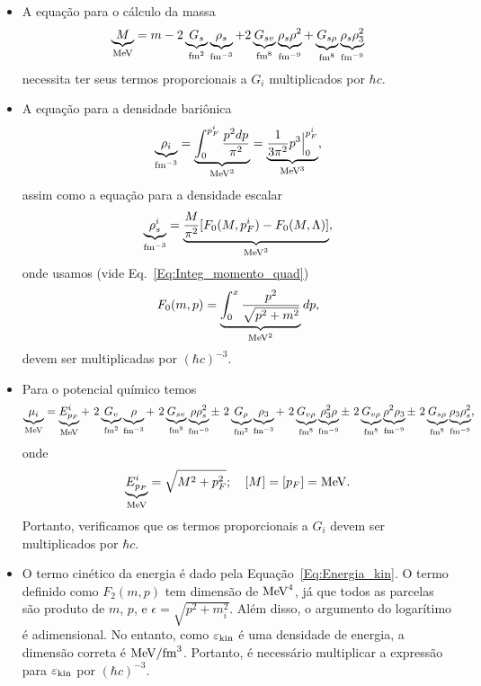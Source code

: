 \begin{fullwidth}
\begin{itemize}
\item A equação para o cálculo da massa
\begin{equation}
	\underbrace{M}_{\rm{MeV}} = m - 2 \underbrace{G_s}_{\rm{fm}^2} \underbrace{\rho_s}_{\rm{fm}^{-3}} + 2 \underbrace{G_{sv}}_{\rm{fm}^8}\underbrace{\rho_s\rho^2}_{\rm{fm}^{-9}} + \underbrace{G_{s\rho}}_{\rm{fm}^8}\underbrace{\rho_s\rho_3^2}_{\rm{fm}^{-9}}
\end{equation}
%
necessita ter seus termos proporcionais a $G_i$ multiplicados por $\hbar c$.

\item A equação para a densidade bariônica
\begin{equation}
	\underbrace{\rho_i}_{\rm{fm}^{-3}} = \underbrace{\int_0^{p_F^i} \frac{p^2 dp}{\pi^2}}_{\rm{MeV}^3} = \underbrace{\frac{1}{3\pi^2}p^3\Big|_0^{p_F^i}}_{\rm{MeV}^3},
\end{equation}
%
assim como a equação para a densidade escalar
\begin{equation}
	\underbrace{\rho_s^i}_{\rm{fm}^{-3}} = \underbrace{\frac{M}{\pi^2}[F_0(M,p_F^i) - F_0(M, \Lambda)]}_{\rm{MeV}^3},
\end{equation}
%
onde usamos (vide Eq.~\eqref{Eq:Integ_momento_quad})
\begin{equation}
	F_0(m,p) = \underbrace{\int_0^x \frac{p^2}{\sqrt{p^2 + m^2}}}_{\rm{MeV}^2} dp,
\end{equation}
%
devem ser multiplicadas por $(\hbar c)^{-3}$.

\item Para o potencial químico temos
\begin{equation}
	\underbrace{\mu_i}_{\rm{MeV}} = \underbrace{E_{p_F}^i}_{\rm{MeV}} +~2 \underbrace{G_v}_{\rm{fm}^2}\underbrace{\rho}_{\rm{fm^{-3}}} +~2 \underbrace{G_{sv}}_{\rm{fm}^8}\underbrace{\rho\rho_s^2}_{\rm{fm^{-9}}} \pm~2 \underbrace{G_\rho}_{\rm{fm}^2}\underbrace{\rho_3}_{\rm{fm^{-3}}} +~2 \underbrace{G_{v\rho}}_{\rm{fm}^8}\underbrace{\rho_3^2\rho}_{\rm{fm^{-9}}} \pm~2 \underbrace{G_{v\rho}}_{\rm{fm}^8}\underbrace{\rho^2\rho_3}_{\rm{fm^{-9}}} \pm~2
\underbrace{G_{s\rho}}_{\rm{fm}^8}\underbrace{\rho_3\rho_s^2}_{\rm{fm^{-9}}},
\end{equation}
%
onde
\begin{equation}
	\underbrace{E_{p_F}^i}_{\rm{MeV}} = \sqrt{M^2 + p_F^2}; \quad [M] = [p_F] = \rm{MeV}.
\end{equation}
%
Portanto, verificamos que os termos proporcionais a $G_i$ devem ser multiplicados por $\hbar c$.

\item O termo cinético da energia é dado pela Equação~\eqref{Eq:Energia_kin}. O termo definido como $F_2(m, p)$ tem dimensão de $\rm{MeV}^4$, já que todos as parcelas são produto de $m$, $p$, e $\epsilon = \sqrt{p^2+m_i^2}$. Além disso, o argumento do logarítimo é adimensional. No entanto, como $\varepsilon_{\rm{kin}}$ é uma densidade de energia, a dimensão correta é $\rm{MeV} / \rm{fm}^3$. Portanto, é necessário multiplicar a expressão para $\varepsilon_{\rm{kin}}$ por $(\hbar c)^{-3}$.
\end{itemize}
\end{fullwidth}

